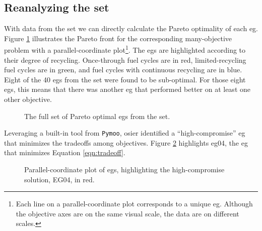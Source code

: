 \subsection{Reanalyzing the \gls{set}}

With data from the \gls{set} we can directly calculate the Pareto optimality of
each \gls{eg}. Figure \ref{fig:full-set-plot} illustrates the Pareto front for
the corresponding many-objective problem with a parallel-coordinate
plot\footnote{Each line on a parallel-coordinate plot corresponds to a unique
\gls{eg}. Although the objective axes are on the same visual scale, the data are
on different scales.}. The \glspl{eg} are highlighted according to their degree
of recycling. Once-through fuel cycles are in red, limited-recycling fuel cycles
are in green, and fuel cycles with continuous recycling are in blue. Eight of
the 40 \glspl{eg} from the \gls{set} were found to be sub-optimal. For those
eight \glspl{eg}, this means that there was another \gls{eg} that performed
better on at least one other objective.

\begin{figure}[ht!]
    \begin{center}
        \resizebox{\columnwidth}{!}{}
        \caption{The full set of Pareto optimal \glspl{eg} from the \gls{set}.}
        \label{fig:full-set-plot}
    \end{center}
\end{figure}


Leveraging a built-in tool from \texttt{Pymoo}, \gls{osier} identified a
``high-compromise'' \gls{eg} that minimizes the tradeoffs among objectives.
Figure \ref{fig:knee-solution} highlights \gls{eg}04, the \gls{eg} that
minimizes Equation \ref{eqn:tradeoff}.

\begin{figure}[ht!]
    \begin{center}
        \resizebox{\columnwidth}{!}{}
        \caption{Parallel-coordinate plot of \glspl{eg}, highlighting 
        the high-compromise solution, EG04, in red.}
        \label{fig:knee-solution}
    \end{center}
\end{figure}

